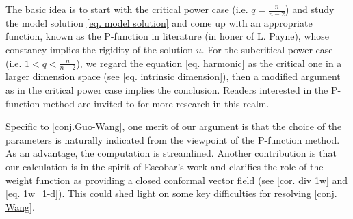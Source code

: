 \documentclass[12pt]{amsart}
\numberwithin{equation}{section}
\numberwithin{lemma}{section}
\numberwithin{proposition}{section}
\numberwithin{corollary}{section}
\numberwithin{remark}{section}
\begin{document}
    The basic idea is to start with the critical power case (i.e. $q=\frac{n}{n-2}$) and study the model solution \cref{eq. model solution} and come up with an appropriate function, known as the P-function in literature (in honer of L. Payne), whose constancy implies the rigidity of the solution $u$. For the subcritical power case (i.e. $1<q<\frac{n}{n-2}$), we regard the equation \cref{eq. harmonic} as the critical one in a larger dimension space (see \cref{eq. intrinsic dimension}), then a modified argument as in the critical power case implies the conclusion. Readers interested in the P-function method are invited to \cite{Pay68,Wei71,Dan11,CFP24} for more research in  this realm.

Specific to \cref{conj.Guo-Wang},  one merit of our argument is that the choice of the parameters is naturally indicated from the viewpoint of the P-function method. As an advantage, the computation is streamlined. Another contribution is that our calculation is in the spirit of Escobar's work \cite{Esc90} and clarifies the role of the weight function as providing a closed conformal vector field (see \cref{cor. div 1w} and \cref{eq. 1w_1-d}). This could shed light on some key difficulties for resolving \cref{conj. Wang}.
\end{document}
